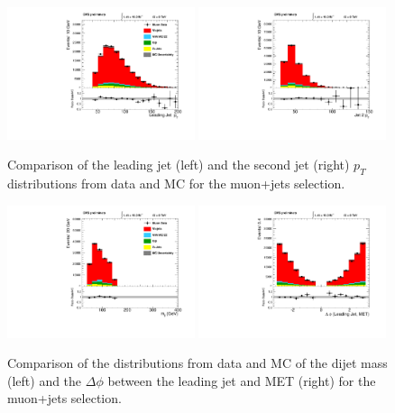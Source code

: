 \begin{figure}[h!t]
  {\centering
    \includegraphics[width=0.49\textwidth]{figs/n-1_plots_mu/mu_jetld_pt.pdf}
    \includegraphics[width=0.49\textwidth]{figs/n-1_plots_mu/mu_jetnt_pt.pdf}
    \caption{Comparison of the leading jet (left) and 
      the second jet (right) $p_{T}$ distributions from data and MC for the muon+jets
      selection.}
    \label{fig:mu_jet_pt}}
\end{figure}
\begin{figure}[h!t]
  {\centering
    \includegraphics[width=0.49\textwidth]{figs/n-1_plots_mu/mu_mjj.pdf}
    \includegraphics[width=0.49\textwidth]{figs/n-1_plots_mu/mu_deltaphi_jetldmet.pdf}
    \caption{Comparison of the distributions from data and MC of the
    dijet mass (left) and the $\Delta \phi $ between the leading jet and MET (right)
    for the muon+jets selection.}
\label{fig:mu_dijetmass}}
\end{figure}
